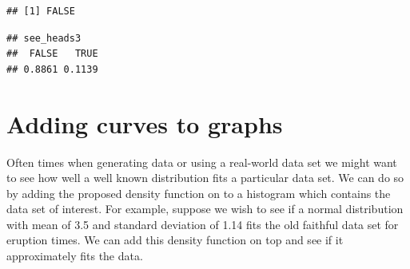 \documentclass[
]{book}
\newenvironment{Shaded}{\begin{snugshade}}{\end{snugshade}}
\newcommand{\CommentTok}[1]{\textcolor[rgb]{0.56,0.35,0.01}{\textit{#1}}}
\newcommand{\DataTypeTok}[1]{\textcolor[rgb]{0.13,0.29,0.53}{#1}}
\newcommand{\DecValTok}[1]{\textcolor[rgb]{0.00,0.00,0.81}{#1}}
\newcommand{\FloatTok}[1]{\textcolor[rgb]{0.00,0.00,0.81}{#1}}
\newcommand{\KeywordTok}[1]{\textcolor[rgb]{0.13,0.29,0.53}{\textbf{#1}}}
\newcommand{\NormalTok}[1]{#1}
\newcommand{\OperatorTok}[1]{\textcolor[rgb]{0.81,0.36,0.00}{\textbf{#1}}}
\newcommand{\OtherTok}[1]{\textcolor[rgb]{0.56,0.35,0.01}{#1}}
\newcommand{\StringTok}[1]{\textcolor[rgb]{0.31,0.60,0.02}{#1}}
\begin{document}
\begin{verbatim}
## [1] FALSE
\end{verbatim}

\begin{Shaded}
\end{Shaded}

\begin{verbatim}
## see_heads3
##  FALSE   TRUE 
## 0.8861 0.1139
\end{verbatim}

\hypertarget{adding-curves-to-graphs}{%
\section{Adding curves to graphs}\label{adding-curves-to-graphs}}

Often times when generating data or using a real-world data set we might want to see how well a well known distribution fits a particular data set. We can do so by adding the proposed density function on to a histogram which contains the data set of interest. For example, suppose we wish to see if a normal distribution with mean of 3.5 and standard deviation of 1.14 fits the old faithful data set for eruption times. We can add this density function on top and see if it approximately fits the data.

\begin{Shaded}
\end{Shaded}
\end{document}
